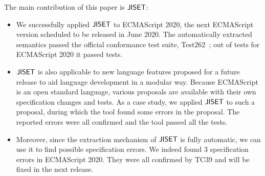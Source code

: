 The main contribution of this paper is \( \text{\sf JISET} \):
\begin{itemize}[leftmargin=0.5cm]
\item We successfully applied \( \text{\sf JISET} \) to ECMAScript 2020, the next
ECMAScript version scheduled to be released in June 2020.  The
automatically extracted semantics passed the official conformance test
suite, Test262~\cite{test262}; out of  tests for
ECMAScript 2020 it passed  tests.
\item \( \text{\sf JISET} \) is also applicable to new language features proposed
for a future release to aid language development in a modular way.
Because ECMAScript is an open standard language, various proposals are
available with their own specification changes and tests.  As a case
study, we applied \( \text{\sf JISET} \) to such a proposal, during which the tool
found some errors in the proposal.  The reported errors were all confirmed
and the tool passed all the tests.
\item Moreover, since the extraction mechanism of \( \text{\sf JISET} \) is fully
automatic, we can use it to find possible specification errors.  We
indeed found 3 specification errors in ECMAScript 2020.  They were all
confirmed by TC39 and will be fixed in the next release.
\end{itemize}
